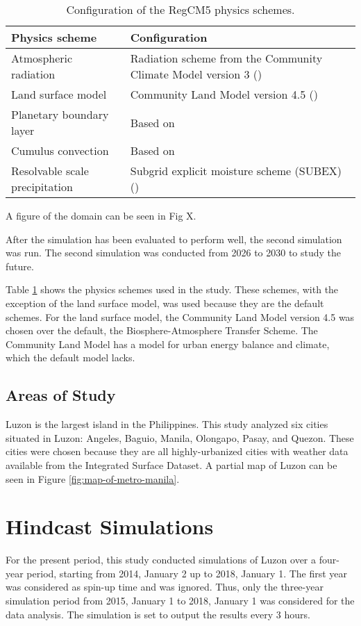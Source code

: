 	\begin{table}	
		\caption{Configuration of the RegCM5 physics schemes.}
		\label{tab:physics-schemes}
		\centering
		\begin{tabular}{l l}
			\hline \hline
			Physics scheme & Configuration\\
			\hline
			Atmospheric radiation & Radiation scheme from the Community Climate Model version 3 (\cite{Kiehl1996}) \\
			Land surface model & Community Land Model version 4.5 (\cite{Oleson2013})\\
			Planetary boundary layer & Based on \textcite{Holtslag1990}\\
			Cumulus convection & Based on \textcite{Emanuel1991}\\
			Resolvable scale precipitation & Subgrid explicit moisture scheme (SUBEX) (\cite{Pal2000})\\
			\hline
		\end{tabular}		
	\end{table}

	A figure of the domain can be seen in Fig X.
	
	After the simulation has been evaluated to perform well, the second simulation was run.
	The second simulation was conducted from 2026 to 2030 to study the future.
	
	Table \ref{tab:physics-schemes} shows the physics schemes used in the study.
	These schemes, with the exception of the land surface model, was used because they are the default schemes. 
	For the land surface model, the Community Land Model version 4.5 was chosen over the default, the Biosphere-Atmosphere Transfer Scheme. 
	The Community Land Model has a model for urban energy balance and climate, which the default model lacks.
	
	\subsection{Areas of Study}
		Luzon is the largest island in the Philippines.
		This study analyzed six cities situated in Luzon:
		Angeles,
		Baguio,
		Manila,
		Olongapo,
		Pasay,
		and
		Quezon.
		These cities were chosen because they are all highly-urbanized cities with weather data available from the Integrated Surface Dataset.
		A partial map of Luzon can be seen in Figure \ref{fig:map-of-metro-manila}.
	
\section{Hindcast Simulations}
	For the present period, this study conducted simulations of Luzon over a four-year period, starting from 2014, January 2 up to 2018, January 1.
	The first year was considered as spin-up time and was ignored.
	Thus, only the three-year simulation period from 2015, January 1 to 2018, January 1 was considered for the data analysis.
	The simulation is set to output the results every 3 hours.
	
